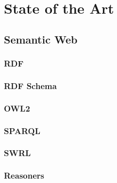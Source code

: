 
%

\chapter{State of the Art}
\label{cha:state-of-the-art}



\section{Semantic Web}
\label{sec:ch2:semantic-web}


\subsection{RDF}
\label{sec:ch2:semantic-web:rdf}

\subsection{RDF Schema}
\label{sec:ch2:semantic-web:rdf-schema}

\subsection{OWL2}
\label{sec:ch2:semantic-web:owl2}

\subsection{SPARQL}
\label{sec:ch2:semantic-web:sparql}

\subsection{SWRL}
\label{sec:ch2:semantic-web:swrl}


\subsection{Reasoners}
\label{sec:ch2:semantic-web:reasoners}

